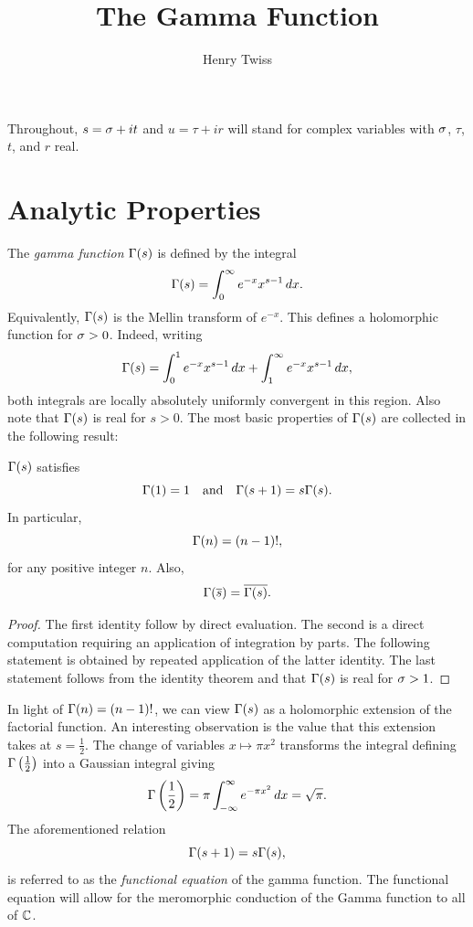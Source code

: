 \documentclass[12pt]{article}
\title{The Gamma Function}
\author{Henry Twiss}
\begin{document}
  \date{}
  \maketitle
  Throughout, \(s = \sigma+it\) and \(u = \tau+ir\) will stand for complex variables with \(\sigma\), \(\tau\), \(t\), and \(r\) real. 
  \section{Analytic Properties}
    The \textit{gamma function} \(\Gamma(s)\) is defined by the integral
    \[
      \Gamma(s) = \int_{0}^{\infty}e^{-x}x^{s-1}\,dx.
    \]
    Equivalently, \(\Gamma(s)\) is the Mellin transform of \(e^{-x}\). This defines a holomorphic function for \(\sigma > 0\). Indeed, writing
    \[
      \Gamma(s) = \int_{0}^{1}e^{-x}x^{s-1}\,dx+\int_{1}^{\infty}e^{-x}x^{s-1}\,dx,
    \]
    both integrals are locally absolutely uniformly convergent in this region. Also note that \(\Gamma(s)\) is real for \(s > 0\). The most basic properties of \(\Gamma(s)\) are collected in the following result:

    \begin{proposition}\label{prop:Factorial_properties_of_gamma_function}
      \(\Gamma(s)\) satisfies
      \[
         \Gamma(1) = 1 \quad \text{and} \quad \Gamma(s+1) = s\Gamma(s).
      \]
      In particular,
      \[
        \Gamma(n) = (n-1)!,
      \]
      for any positive integer \(n\). Also,
      \[
        \Gamma(\overline{s}) = \overline{\Gamma(s)}.
      \]
    \end{proposition}
    \begin{proof}
      The first identity follow by direct evaluation. The second is a direct computation requiring an application of integration by parts. The following statement is obtained by repeated application of the latter identity. The last statement follows from the identity theorem and that \(\Gamma(s)\) is real for \(\sigma > 1\).
    \end{proof}

    In light of \(\Gamma(n) = (n-1)!\), we can view \(\Gamma(s)\) as a holomorphic extension of the factorial function. An interesting observation is the value that this extension takes at \(s = \frac{1}{2}\). The change of variables \(x \mapsto \pi x^{2}\) transforms the integral defining \(\Gamma\left(\frac{1}{2}\right)\) into a Gaussian integral giving
    \begin{equation}\label{equ:gamma_function_at_1/2}
      \Gamma\left(\frac{1}{2}\right) = \pi\int_{-\infty}^{\infty}e^{-\pi x^{2}}\,dx = \sqrt{\pi}.
    \end{equation}
    The aforementioned relation
    \[
      \Gamma(s+1) = s\Gamma(s),
    \]
    is referred to as the \textit{functional equation} of the gamma function. The functional equation will allow for the meromorphic conduction of the Gamma function to all of \(\mathbb{C}\).
\end{document}
